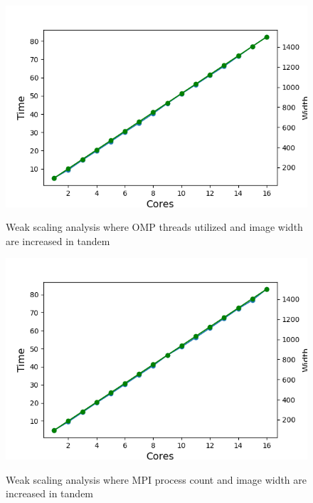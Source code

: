 \begin{figure}[h]
  \centering
  \begin{minipage}{0.45\linewidth}
      \includegraphics[width=\linewidth]{figs/omp_weak2.out}
      \caption{Weak scaling analysis where OMP threads utilized and image width are increased in tandem}
        \label{fig:omp_weak2}
    \end{minipage}
  \hspace{.05\linewidth}
 \begin{minipage}{0.45\linewidth}
  \includegraphics[width=\linewidth]{figs/mpi_weak2.out}
 \caption{Weak scaling analysis where MPI process count and image width are increased in tandem}
    \label{fig:mpi_weak2}
    \end{minipage}

\end{figure}
